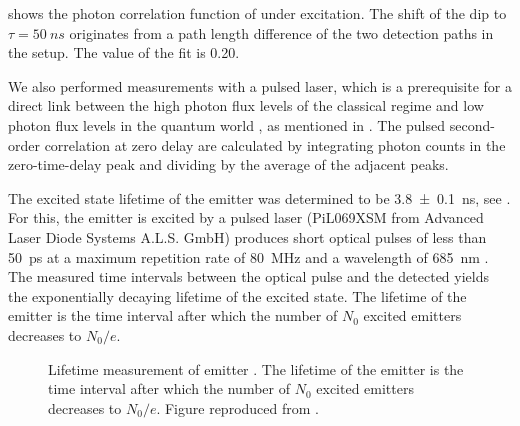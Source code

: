 		 shows the photon correlation function of \emhtwo under \cw excitation.
		The shift of the dip to $\tau=\SI{50}{ns}$ originates from a path length difference of the two detection paths in the \HBT setup.
		The \gtz value of the fit is \num{0.20}.
		
		We also performed measurements with a pulsed laser, which is a prerequisite for a direct link between the high photon flux levels of the classical regime and low photon flux levels in the quantum world \cite{Vaigu2017,SiquteProject}, as mentioned in .
		The pulsed second-order correlation at zero delay \gtz are calculated by integrating photon counts in the zero-time-delay peak and dividing by the average of the adjacent peaks.
		
		The excited state lifetime of the emitter was determined to be \SI[separate-uncertainty]{3.8\pm0.1}{ns}, see .
		For this, the emitter is excited by a pulsed laser (PiL069XSM from Advanced Laser Diode Systems A.L.S. GmbH) produces short optical pulses of less than \SI{50}{\ps} at a maximum repetition rate of \SI{80}{\mega\hertz} and a wavelength of \SI{685}{\nm} \cite{Vaigu2017}. 
		The measured time intervals between the optical pulse and the detected \fl yields the exponentially decaying lifetime of the excited state.
		The lifetime of the emitter is the time interval after which the number of $N_0$ excited emitters decreases to $N_0/e$.
		
		\begin{figure}[!htb]
			\centering
			\caption[Lifetime measurement of an emitter]{Lifetime measurement of emitter \emhtwo. The lifetime of the emitter is the time interval after which the number of $N_0$ excited emitters decreases to $N_0/e$. Figure reproduced from \cite{Vaigu2017}.}
			\label{fig::lifetime}
		\end{figure}

